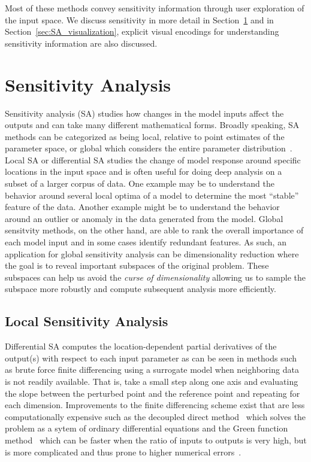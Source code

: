 Most of these methods convey sensitivity information through user exploration of the input space.
%
We discuss sensitivity in more detail in Section~\ref{sec:sensitivity} and in Section~\ref{sec:SA_visualization}, explicit visual encodings for understanding sensitivity information are also discussed.

\section{Sensitivity Analysis}
\label{sec:sensitivity}

Sensitivity analysis (SA) studies how changes in the model inputs affect the outputs and can take many different mathematical forms.
%
Broadly speaking, SA methods can be categorized as being local, relative to point estimates of the parameter space, or global which considers the entire parameter distribution~\cite{Hamby1995}.
%
Local SA or differential SA studies the change of model response around specific locations in the input space and is often useful for doing deep analysis on a subset of a larger corpus of data.
%
One example may be to understand the behavior around several local optima of a model to determine the most ``stable'' feature of the data.
%
Another example might be to understand the behavior around an outlier or anomaly in the data generated from the model.
%
Global sensitvity methods, on the other hand, are able to rank the overall importance of each model input and in some cases identify redundant features.
%
As such, an application for global sensitivity analysis can be dimensionality reduction where the goal is to reveal important subspaces of the original problem.
%
These subspaces can help us avoid the \emph{curse of dimensionality} allowing us to sample the subspace more robustly and compute subsequent analysis more efficiently.

\subsection{Local Sensitivity Analysis}

Differential SA computes the location-dependent partial derivatives of the output(s) with respect to each input parameter as can be seen in methods such as brute force finite differencing using a surrogate model when neighboring data is not readily available.
%
That is, take a small step along one axis and evaluating the slope between the perturbed point and the reference point and repeating for each dimension.
%
Improvements to the finite differencing scheme exist that are less computationally expensive such as the decoupled direct method~\cite{Dunker1981,Dunker1984} which solves the problem as a sytem of ordinary differential equations and the Green function method~\cite{KramerCaloRabitz1981} which can be faster when the ratio of inputs to outputs is very high, but is more complicated and thus prone to higher numerical errors~\cite{SaltelliChanScott2000}.

